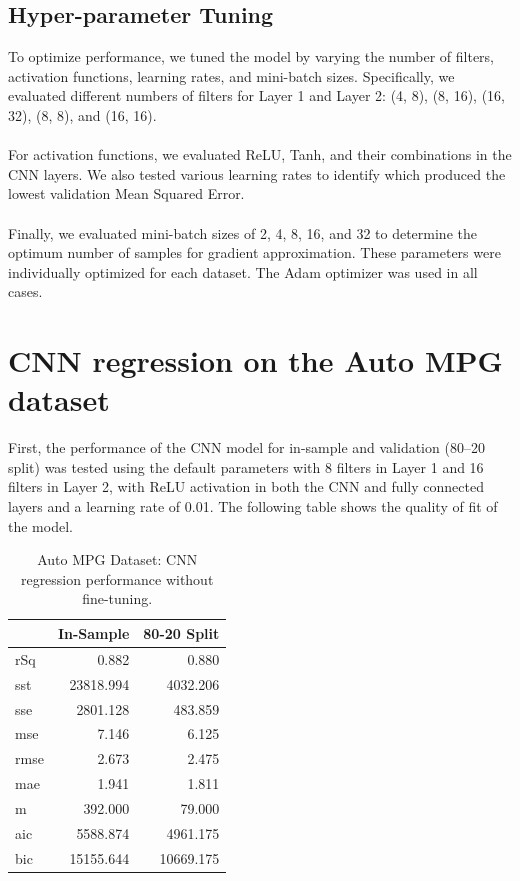 \documentclass[11pt]{article}
\begin{document}
\subsection{Hyper-parameter Tuning}
To optimize performance, we tuned the model by varying the number of filters, activation functions, learning rates, and mini-batch sizes. Specifically, we evaluated different numbers of filters for Layer 1 and Layer 2: (4, 8), (8, 16), (16, 32), (8, 8), and (16, 16). \\
\\
For activation functions, we evaluated ReLU, Tanh, and their combinations in the CNN layers. We also tested various learning rates to identify which produced the lowest validation Mean Squared Error.\\ 
\\
Finally, we evaluated mini-batch sizes of 2, 4, 8, 16, and 32 to determine the optimum number of samples for gradient approximation. These parameters were individually optimized for each dataset. The Adam optimizer was used in all cases.

\section*{CNN regression on the Auto MPG dataset}
First, the performance of the CNN model for in-sample and validation (80–20 split) was tested using the default parameters with 8 filters in Layer 1 and 16 filters in Layer 2, with ReLU activation in both the CNN and fully connected layers and a learning rate of 0.01. The following table shows the quality of fit of the model.

\begin{table}[H]
\centering
\caption{Auto MPG Dataset: CNN regression performance without fine-tuning.}
\label{tab:Auto_MPG_(In-Sample)}
\begin{tabular}{lrr}
\toprule
 & In-Sample & 80-20 Split \\
\midrule
rSq & 0.882 & 0.880 \\
sst & 23818.994 & 4032.206 \\
sse & 2801.128 & 483.859 \\
mse & 7.146 & 6.125 \\
rmse & 2.673 & 2.475 \\
mae & 1.941 & 1.811 \\
m & 392.000 & 79.000 \\
aic & 5588.874 & 4961.175 \\
bic & 15155.644 & 10669.175 \\
\bottomrule
\end{tabular}
\end{table}
\end{document}
